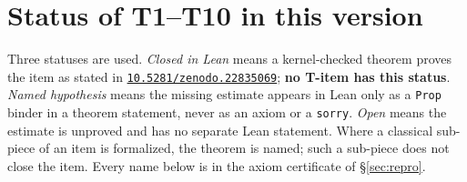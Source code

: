 \documentclass[11pt]{article}
\theoremstyle{plain}
\theoremstyle{definition}
\theoremstyle{remark}
\newcommand{\doi}[1]{\href{https://doi.org/#1}{\texttt{#1}}}
\begin{document}
\section{Status of T1--T10 in this version}
\label{sec:status}

Three statuses are used. \emph{Closed in Lean} means a kernel-checked theorem proves the item as stated in \doi{10.5281/zenodo.22835069}; \textbf{no T-item has this status}. \emph{Named hypothesis} means the missing estimate appears in Lean only as a \texttt{Prop} binder in a theorem statement, never as an axiom or a \texttt{sorry}. \emph{Open} means the estimate is unproved and has no separate Lean statement. Where a classical sub-piece of an item is formalized, the theorem is named; such a sub-piece does not close the item. Every name below is in the axiom certificate of \S\ref{sec:repro}.
\end{document}

